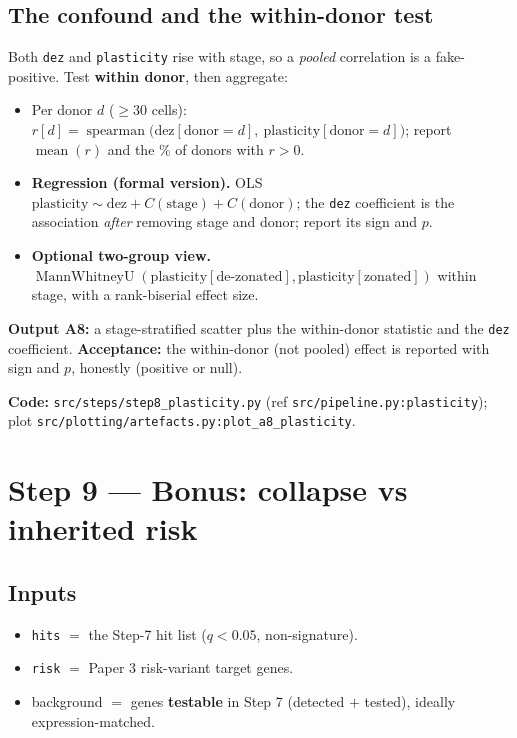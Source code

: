 \documentclass[11pt]{article}
\newcommand{\code}[1]{\texttt{\small #1}}
\begin{document}
\subsection{The confound and the within-donor test}
Both \code{dez} and \code{plasticity} rise with stage, so a \emph{pooled} correlation is a
fake-positive. Test \textbf{within donor}, then aggregate:
\begin{itemize}[leftmargin=1.4em]
  \item Per donor $d$ ($\ge 30$ cells):
        $r[d] = \operatorname{spearman}\big(\text{dez}[\text{donor}=d],\ \text{plasticity}[\text{donor}=d]\big)$;
        report $\operatorname{mean}(r)$ and the $\%$ of donors with $r > 0$.
  \item \textbf{Regression (formal version).} OLS
        $\text{plasticity} \sim \text{dez} + C(\text{stage}) + C(\text{donor})$; the \code{dez}
        coefficient is the association \emph{after} removing stage and donor; report its sign and
        $p$.
  \item \textbf{Optional two-group view.}
        $\operatorname{MannWhitneyU}(\text{plasticity}[\text{de-zonated}], \text{plasticity}[\text{zonated}])$
        within stage, with a rank-biserial effect size.
\end{itemize}

\textbf{Output A8:} a stage-stratified scatter plus the within-donor statistic and the \code{dez}
coefficient. \textbf{Acceptance:} the within-donor (not pooled) effect is reported with sign and
$p$, honestly (positive or null).

\medskip
\noindent\textbf{Code:} \code{src/steps/step8\_plasticity.py} (ref \code{src/pipeline.py:plasticity});
plot \code{src/plotting/artefacts.py:plot\_a8\_plasticity}.

\section{Step 9 --- Bonus: collapse vs inherited risk}

\subsection{Inputs}
\begin{itemize}[leftmargin=1.4em]
  \item \code{hits} $=$ the Step-7 hit list ($q < 0.05$, non-signature).
  \item \code{risk} $=$ Paper 3 risk-variant target genes.
  \item background $=$ genes \textbf{testable} in Step 7 (detected $+$ tested), ideally
        expression-matched.
\end{itemize}
\end{document}
